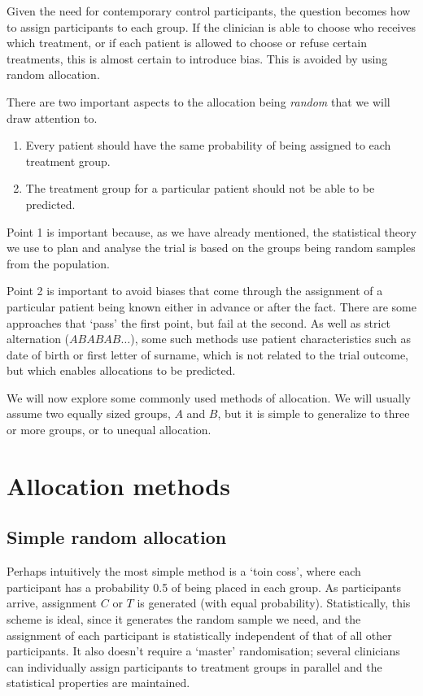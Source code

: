 \documentclass[
  openany]{book}
\providecommand{\tightlist}{%
  \setlength{\itemsep}{0pt}\setlength{\parskip}{0pt}}
\theoremstyle{definition}
\theoremstyle{definition}
\theoremstyle{definition}
\theoremstyle{definition}
\theoremstyle{remark}
\begin{document}
Given the need for contemporary control participants, the question becomes how to assign participants to each group. If the clinician is able to choose who receives which treatment, or if each patient is allowed to choose or refuse certain treatments, this is almost certain to introduce bias. This is avoided by using random allocation.

There are two important aspects to the allocation being \emph{random} that we will draw attention to.

\begin{enumerate}
\def\labelenumi{\arabic{enumi}.}
\tightlist
\item
  Every patient should have the same probability of being assigned to each treatment group.
\item
  The treatment group for a particular patient should not be able to be predicted.
\end{enumerate}

Point 1 is important because, as we have already mentioned, the statistical theory we use to plan and analyse the trial is based on the groups being random samples from the population.

Point 2 is important to avoid biases that come through the assignment of a particular patient being known either in advance or after the fact. There are some approaches that `pass' the first point, but fail at the second. As well as strict alternation (\(ABABAB\ldots\)), some such methods use patient characteristics such as date of birth or first letter of surname, which is not related to the trial outcome, but which enables allocations to be predicted.

We will now explore some commonly used methods of allocation. We will usually assume two equally sized groups, \(A\) and \(B\), but it is simple to generalize to three or more groups, or to unequal allocation.

\hypertarget{sec-allocation}{%
\section{Allocation methods}\label{sec-allocation}}

\hypertarget{simple-random-allocation}{%
\subsection{Simple random allocation}\label{simple-random-allocation}}

Perhaps intuitively the most simple method is a `toin coss', where each participant has a probability 0.5 of being placed in each group. As participants arrive, assignment \(C\) or \(T\) is generated (with equal probability). Statistically, this scheme is ideal, since it generates the random sample we need, and the assignment of each participant is statistically independent of that of all other participants. It also doesn't require a `master' randomisation; several clinicians can individually assign participants to treatment groups in parallel and the statistical properties are maintained.
\end{document}
